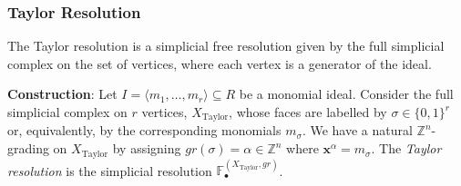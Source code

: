 \documentclass[paper=a4, fontsize=11pt]{scrartcl} %
\theoremstyle{plain}
\theoremstyle{definition}
\begin{document}
\subsubsection{Taylor Resolution}

The Taylor resolution is a simplicial free resolution given by the full simplicial complex on the set of vertices, where each vertex is a generator of the ideal.

\textbf{Construction}: Let $I = \langle m_1, \dots, m_r \rangle \subseteq R$ be a monomial ideal. Consider the full simplicial complex on $r$ vertices, $X_{\text{Taylor}}$, whose faces are labelled by $\sigma \in \lbrace 0,1 \rbrace^r$ or, equivalently, by the corresponding monomials $m_{\sigma}$. We have a natural $\mathbb{Z}^n$-grading on $X_{\text{Taylor}}$ by assigning $gr(\sigma) = \alpha \in \mathbb{Z}^n$ where $\mathbf{x}^{\alpha} = m_{\sigma}$. The \textit{Taylor resolution} is the simplicial resolution $\mathbb{F}_{\bullet}^{(X_{\text{Taylor}},gr)}$.
\end{document}
